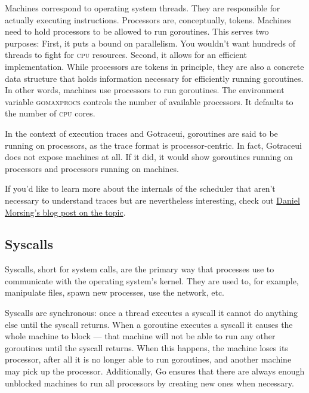 \documentclass[10pt,letterpaper,oneside,openany,english]{memoir}
\newcommand{\code}[1]{{\ttfamily\mbox{#1}}}
\begin{document}
Machines correspond to operating system threads.
They are responsible for actually executing instructions.
Processors are, conceptually, tokens.
Machines need to hold processors to be allowed to run goroutines.
This serves two purposes:
First, it puts a bound on parallelism.
You wouldn't want hundreds of threads to fight for \textsc{cpu} resources.
Second, it allows for an efficient implementation.
While processors are tokens in principle, they are also a concrete data structure that holds information necessary for efficiently running goroutines.
In other words, machines use processors to run goroutines.
The environment variable \code{\textsc{gomaxprocs}} controls the number of available processors.
It defaults to the number of \textsc{cpu} cores.

In the context of execution traces and Gotraceui, goroutines are said to be running on processors, as the trace format is processor-centric.
In fact, Gotraceui does not expose machines at all.
If it did, it would show goroutines running on processors and processors running on machines.

If you'd like to learn more about the internals of the scheduler that aren't necessary to understand traces but are nevertheless interesting, check out \href{https://morsmachine.dk/go-scheduler}{Daniel Morsing's blog post on the topic}.\cite{morsingGoScheduler2013}

\subsection{Syscalls}\label{syscalls}
Syscalls, short for system calls, are the primary way that processes use to communicate with the operating system's kernel.
They are used to, for example, manipulate files, spawn new processes, use the network, etc.

Syscalls are synchronous: once a thread executes a syscall it cannot do anything else until the syscall returns.
When a goroutine executes a syscall it causes the whole machine to block --- that machine will not be able to run any other goroutines until the syscall returns.
When this happens, the machine loses its processor, after all it is no longer able to run goroutines, and another machine may pick up the processor.
Additionally, Go ensures that there are always enough unblocked machines to run all processors by creating new ones when necessary.
\end{document}

